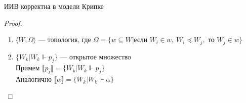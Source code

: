 \documentclass[english]{article}
\begin{document}
\begin{theorem}
	ИИВ корректна в модели Крипке
	\label{org29cc3fc}
\end{theorem}
\begin{proof}
	\begin{enumerate}
		\item \(\langle W, \Omega \rangle\) --- топология, где \(\Omega = \{w \subseteq W | \text{если }W_i \in w,\ W_i \preceq W_j,\text{ то } W_j \in w\}\) \\
		\item \(\{W_k | W_k \Vdash p_j\}\) --- открытое множество \\
		      Примем \(\llbracket p_j \rrbracket = \{W_k | W_k \Vdash p_j\}\) \\
		      Аналогично \(\llbracket \alpha \rrbracket = \{W_k | W_k \Vdash \alpha\}\)
	\end{enumerate}
\end{proof}
\end{document}
